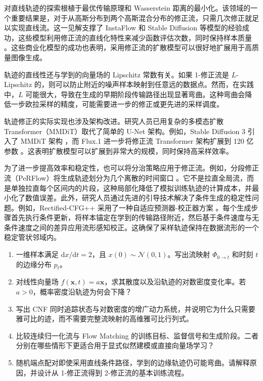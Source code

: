 对直线轨迹的探索根植于最优传输原理和 Wasserstein 距离的最小化。该领域的一个重要结果是，对于从高斯分布到两个高斯混合分布的修正流，只需几次修正就足以实现直线流。这一见解支撑了 InstaFlow 和 Stable Diffusion 等模型的经验成功，这些模型利用修正流的直线化特性来减少函数评估次数，同时保持样本质量 \citep{esser-etal:2024scaling}。这些商业化模型的成功也表明，采用修正流的扩散模型可以很好地扩展用于高质量图像生成。

轨迹的直线性还与学到的向量场的 Lipschitz 常数有关。如果 1-修正流是 $L$-Lipschitz 的，则可以防止附近的噪声样本映射到任意远的数据点。然而，在实践中，$L$ 可能很大，导致在生成的早期阶段传输路径出现显著弯曲。这种弯曲会降低一步欧拉采样的精度，可能需要进一步的修正或更先进的采样调度。

轨迹修正的实际实现也涉及架构改进。研究人员已用复杂的多模态扩散 Transformer（MMDiT）取代了简单的 U-Net 架构。例如，Stable Diffusion 3 引入了 MMDiT 架构 \citep{esser-etal:2024scaling}，而 Flux.1 进一步将修正流 Transformer 架构扩展到 120 亿参数 \citep{greenberg-etal:2025demystifying}。这表明扩散模型可以扩展到非常大的规模，同时保持高采样效率。

为了进一步提高效率和稳定性，也可以将分治策略应用于修正流。例如，分段修正流（PeRFlow）将生成轨迹划分为几个离散的时间窗口 \citep{yan-etal:2024perflow}。它不是拉直全局流，而是单独拉直每个区间内的片段，这种局部化降低了模拟训练轨迹的计算成本，并最小化了数值误差。此外，研究人员通过先进的引导技术解决了条件生成的稳定性问题。例如，Rectified-CFG++ 采用了一种自适应预测器-校正器方案 \citep{saini-etal:2025rectified}。每个生成步骤首先执行条件更新，将样本锚定在学到的传输路径附近，然后基于条件速度与无条件速度之间的差异应用流形感知校正。这确保了采样轨迹保持在数据流形的一个稳定管状邻域内。

\begin{exercisebox}
  \begin{enumerate}
    \item 一维样本满足 \(\mathrm dx/\mathrm dt=2\)，且 \(x(0)\sim\mathcal N(0,1)\)。写出流映射 \(\Phi_{0\to t}\) 和时刻 \(t\) 的边缘分布 \(p_t\)。
    \item 对线性向量场 \(f(\boldsymbol x,t)=a\boldsymbol x\)，求其散度以及沿轨迹的对数密度变化率。若 \(a>0\)，概率密度沿轨迹为何会下降？
    \item 写出 CNF 同时追踪状态与对数密度的增广动力系统，并说明它为什么只需要雅可比的迹，而不需要完整流映射的高维雅可比行列式。
    \item 比较连续归一化流与 Flow Matching 的训练目标、监督信号和生成阶段。二者分别在哪些情形下更适合用于显式似然建模或直接向量场学习？
    \item 随机端点配对即使采用直线条件路径，学到的边缘轨迹仍可能弯曲。请解释原因，并设计从 1-修正流得到 2-修正流的基本训练流程。
  \end{enumerate}
\end{exercisebox}


